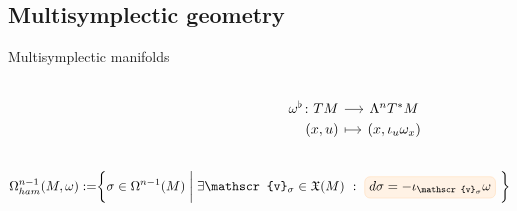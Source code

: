 \documentclass[handout,10pt]{beamer}
\begin{document}
\subsection{Multisymplectic geometry}



\begin{frame}[fragile]{Multisymplectic manifolds} %
	\begin{defblock}
		
	\end{defblock}
	\begin{defblock}
		\begin{columns}
			\begin{column}{.45\linewidth}
			\end{column}
			\begin{column}{.5\linewidth}
						\vspace{-.5em}
				\[
				\begin{tikzcd}[column sep= small,row sep=0ex,
				/tikz/column 1/.append style={anchor=base east}]
				    \omega^\flat \colon T M \ar[r]& \Lambda^n T^\ast M \\
  						 (x,u) \ar[r, mapsto]& (x,\iota_{u} \omega_x)						
				\end{tikzcd}	
				\]
			\end{column}
		\end{columns}
	\end{defblock}
	\pause
	\begin{defblock}
		\begin{displaymath}
			\Omega^{n-1}_{ham}(M,\omega) 	:=
			\biggr\{ \sigma \in  \Omega^{n-1}(M) \; \biggr\vert \; 
				\exists \mathscr{v}_\sigma \in \mathfrak{X}(M) ~:~ 
				\tikz[baseline,remember picture]{\node[rounded corners,
                        fill=orange!10,draw=orange!30,anchor=base]            
            			(target) {$d \sigma = -\iota_{\mathscr{v}_\sigma} \omega$ };
            	}				
				~\biggr\} 
			\end{displaymath}
	\end{defblock}

\end{frame}
\end{document}
